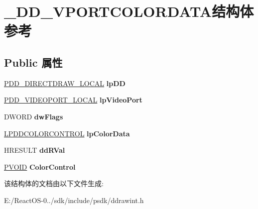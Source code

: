 \hypertarget{struct___d_d___v_p_o_r_t_c_o_l_o_r_d_a_t_a}{}\section{\+\_\+\+D\+D\+\_\+\+V\+P\+O\+R\+T\+C\+O\+L\+O\+R\+D\+A\+T\+A结构体 参考}
\label{struct___d_d___v_p_o_r_t_c_o_l_o_r_d_a_t_a}
\subsection*{Public 属性}
\begin{DoxyCompactItemize}
\item 
\mbox{\label{struct___d_d___v_p_o_r_t_c_o_l_o_r_d_a_t_a_aa826dd2ca6d9112c0b782efb2cd47488}} 
\hyperlink{struct___d_d___d_i_r_e_c_t_d_r_a_w___l_o_c_a_l}{P\+D\+D\+\_\+\+D\+I\+R\+E\+C\+T\+D\+R\+A\+W\+\_\+\+L\+O\+C\+AL} {\bfseries lp\+DD}
\item 
\mbox{\label{struct___d_d___v_p_o_r_t_c_o_l_o_r_d_a_t_a_a2f96faad969a825359ed74b9ff7f08a3}} 
\hyperlink{struct___d_d___v_i_d_e_o_p_o_r_t___l_o_c_a_l}{P\+D\+D\+\_\+\+V\+I\+D\+E\+O\+P\+O\+R\+T\+\_\+\+L\+O\+C\+AL} {\bfseries lp\+Video\+Port}
\item 
\mbox{\label{struct___d_d___v_p_o_r_t_c_o_l_o_r_d_a_t_a_aa2369833be922551a9ae58192ece5137}} 
D\+W\+O\+RD {\bfseries dw\+Flags}
\item 
\mbox{\label{struct___d_d___v_p_o_r_t_c_o_l_o_r_d_a_t_a_a74ea16767103f9384b98155e9a257912}} 
\hyperlink{struct___d_d_c_o_l_o_r_c_o_n_t_r_o_l}{L\+P\+D\+D\+C\+O\+L\+O\+R\+C\+O\+N\+T\+R\+OL} {\bfseries lp\+Color\+Data}
\item 
\mbox{\label{struct___d_d___v_p_o_r_t_c_o_l_o_r_d_a_t_a_aabcbe45e77aa94d5c1822ea19f8cacf3}} 
H\+R\+E\+S\+U\+LT {\bfseries dd\+R\+Val}
\item 
\mbox{\label{struct___d_d___v_p_o_r_t_c_o_l_o_r_d_a_t_a_a0a78a7f6830307bfadd51c793d3fec00}} 
\hyperlink{interfacevoid}{P\+V\+O\+ID} {\bfseries Color\+Control}
\end{DoxyCompactItemize}


该结构体的文档由以下文件生成\+:\begin{DoxyCompactItemize}
\item 
E\+:/\+React\+O\+S-\/0../sdk/include/psdk/ddrawint.\+h\end{DoxyCompactItemize}
